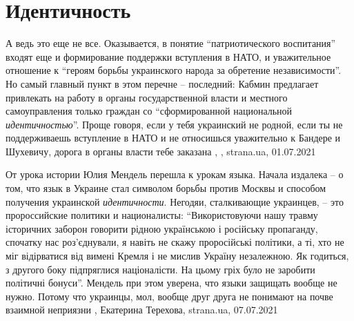  
 
 
 
 
\chapter{Идентичность}
\label{sec:slova.identichnost}

А ведь это еще не все. Оказывается, в понятие \enquote{патриотического воспитания}
входят еще и формирование поддержки вступления в НАТО, и уважительное отношение
к \enquote{героям борьбы украинского народа за обретение независимости}.  Но самый
главный пункт в этом перечне – последний: Кабмин предлагает привлекать на
работу в органы государственной власти и местного самоуправления только граждан
со \enquote{сформированной национальной \emph{идентичностью}}. Проще говоря, если у тебя
украинский не родной, если ты не поддерживаешь вступление в НАТО и не
относишься уважительно к Бандере и Шухевичу, дорога в органы власти тебе
заказана
, 
, strana.ua, 01.07.2021

От урока истории Юлия Мендель перешла к урокам языка.  Начала издалека – о том,
что язык в Украине стал символом борьбы против Москвы и способом получения
украинской \emph{идентичности}. Негодяи, сталкивающие украинцев, – это
пророссийские политики и националисты: \enquote{Використовуючи нашу травму
історичних заборон говорити рідною українською і російську пропаганду, спочатку
нас роз’єднували, я навіть не скажу проросійські політики, а ті, хто не міг
відірватися від вимені Кремля і не мислив Україну незалежною.  Як годиться, з
другого боку підпряглися націоналісти. На цьому гріх було не заробити політичні
бонуси}.  Мендель при этом уверена, что языки защищать вообще не нужно. Потому
что украинцы, мол, вообще друг друга не понимают на почве взаимной неприязни
, 
Екатерина Терехова, strana.ua, 07.07.2021
